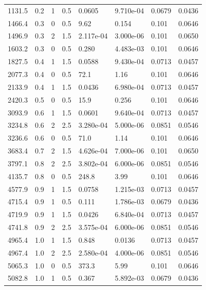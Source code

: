 \documentclass[preview]{standalone}
\begin{document}
{{\begin{tabular}{L{1.2cm}C{1.2cm} C{0.3cm}C{0.5cm} C{1.4cm}C{1.4cm} C{1.4cm}C{1.4cm}}
  1131.5  &   0.2  & 1     & 0.5 &  0.0605  & 9.710e-04  & 0.0679 &  0.0436   \\ 
  1466.4  &   0.3  & 0     & 0.5 &  9.62  & 0.154  & 0.101 &  0.0646   \\ 
  1496.9  &   0.3  & 2     & 1.5 &  2.117e-04  & 3.000e-06  & 0.101 &  0.0650   \\ 
  1603.2  &   0.3  & 0     & 0.5 &  0.280  & 4.483e-03  & 0.101 &  0.0646   \\ 
  1827.5  &   0.4  & 1     & 1.5 &  0.0588  & 9.430e-04  & 0.0713 &  0.0457   \\ 
  2077.3  &   0.4  & 0     & 0.5 &  72.1  & 1.16  & 0.101 &  0.0646   \\ 
  2133.9  &   0.4  & 1     & 1.5 &  0.0436  & 6.980e-04  & 0.0713 &  0.0457   \\ 
  2420.3  &   0.5  & 0     & 0.5 &  15.9  & 0.256  & 0.101 &  0.0646   \\ 
  3093.9  &   0.6  & 1     & 1.5 &  0.0601  & 9.640e-04  & 0.0713 &  0.0457   \\ 
  3234.8  &   0.6  & 2     & 2.5 &  3.280e-04  & 5.000e-06  & 0.0851 &  0.0546   \\ 
  3236.6  &   0.6  & 0     & 0.5 &  71.0  & 1.14  & 0.101 &  0.0646   \\ 
  3683.4  &   0.7  & 2     & 1.5 &  4.626e-04  & 7.000e-06  & 0.101 &  0.0650   \\ 
  3797.1  &   0.8  & 2     & 2.5 &  3.802e-04  & 6.000e-06  & 0.0851 &  0.0546   \\ 
  4135.7  &   0.8  & 0     & 0.5 &  248.8  & 3.99  & 0.101 &  0.0646   \\ 
  4577.9  &   0.9  & 1     & 1.5 &  0.0758  & 1.215e-03  & 0.0713 &  0.0457   \\ 
  4715.4  &   0.9  & 1     & 0.5 &  0.111  & 1.786e-03  & 0.0679 &  0.0436   \\ 
  4719.9  &   0.9  & 1     & 1.5 &  0.0426  & 6.840e-04  & 0.0713 &  0.0457   \\ 
  4741.8  &   0.9  & 2     & 2.5 &  3.575e-04  & 6.000e-06  & 0.0851 &  0.0546   \\ 
  4965.4  &   1.0  & 1     & 1.5 &  0.848  & 0.0136  & 0.0713 &  0.0457   \\ 
  4967.4  &   1.0  & 2     & 2.5 &  2.580e-04  & 4.000e-06  & 0.0851 &  0.0546   \\ 
  5065.3  &   1.0  & 0     & 0.5 &  373.3  & 5.99  & 0.101 &  0.0646   \\ 
  5082.8  &   1.0  & 1     & 0.5 &  0.367  & 5.892e-03  & 0.0679 &  0.0436   \\ 

\end{tabular}}}
\end{document}
